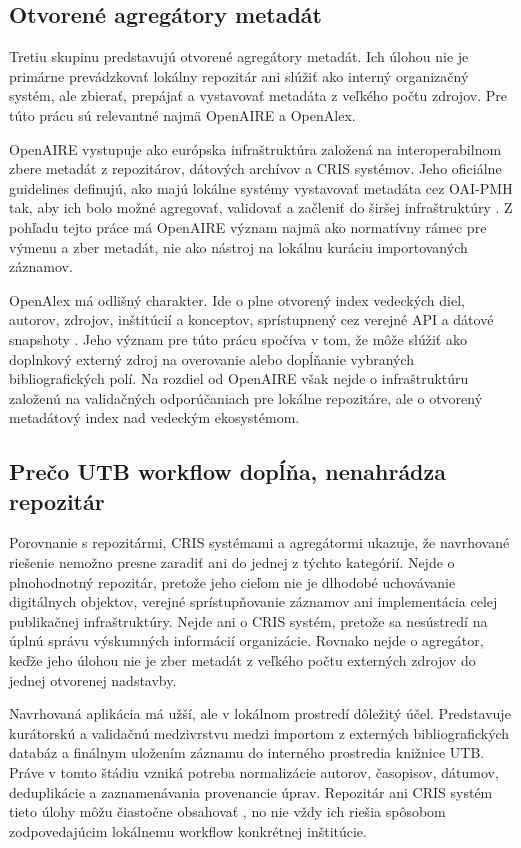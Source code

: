 \subsection{Otvorené agregátory metadát}

Tretiu skupinu predstavujú otvorené agregátory metadát. Ich úlohou nie je primárne prevádzkovať lokálny repozitár ani slúžiť ako interný organizačný systém, ale zbierať, prepájať a vystavovať metadáta z veľkého počtu zdrojov. Pre túto prácu sú relevantné najmä OpenAIRE a OpenAlex.

OpenAIRE vystupuje ako európska infraštruktúra založená na interoperabilnom zbere metadát z repozitárov, dátových archívov a CRIS systémov. Jeho oficiálne guidelines definujú, ako majú lokálne systémy vystavovať metadáta cez OAI-PMH tak, aby ich bolo možné agregovať, validovať a začleniť do širšej infraštruktúry \cite{OpenAIREGuidelines4}. Z pohľadu tejto práce má OpenAIRE význam najmä ako normatívny rámec pre výmenu a zber metadát, nie ako nástroj na lokálnu kuráciu importovaných záznamov.

OpenAlex má odlišný charakter. Ide o plne otvorený index vedeckých diel, autorov, zdrojov, inštitúcií a konceptov, sprístupnený cez verejné API a dátové snapshoty \cite{OpenAlexPaper,OpenAlexDocs}. Jeho význam pre túto prácu spočíva v tom, že môže slúžiť ako doplnkový externý zdroj na overovanie alebo dopĺňanie vybraných bibliografických polí. Na rozdiel od OpenAIRE však nejde o infraštruktúru založenú na validačných odporúčaniach pre lokálne repozitáre, ale o otvorený metadátový index nad vedeckým ekosystémom.

\subsection{Prečo UTB workflow dopĺňa, nenahrádza repozitár}

Porovnanie s repozitármi, CRIS systémami a agregátormi ukazuje, že navrhované riešenie nemožno presne zaradiť ani do jednej z týchto kategórií. Nejde o plnohodnotný repozitár, pretože jeho cieľom nie je dlhodobé uchovávanie digitálnych objektov, verejné sprístupňovanie záznamov ani implementácia celej publikačnej infraštruktúry. Nejde ani o CRIS systém, pretože sa nesústredí na úplnú správu výskumných informácií organizácie. Rovnako nejde o agregátor, keďže jeho úlohou nie je zber metadát z veľkého počtu externých zdrojov do jednej otvorenej nadstavby.

Navrhovaná aplikácia má užší, ale v lokálnom prostredí dôležitý účel. Predstavuje kurátorskú a validačnú medzivrstvu medzi importom z externých bibliografických databáz a finálnym uložením záznamu do interného prostredia knižnice UTB. Práve v tomto štádiu vzniká potreba normalizácie autorov, časopisov, dátumov, deduplikácie a zaznamenávania provenancie úprav. Repozitár ani CRIS systém tieto úlohy môžu čiastočne obsahovať \cite{DSpaceDocs,PureRIMS}, no nie vždy ich riešia spôsobom zodpovedajúcim lokálnemu workflow konkrétnej inštitúcie.

